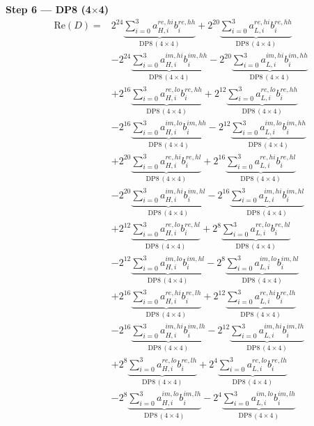 \documentclass[fleqn]{article}
\newcommand{\DPop}[3]{\mathrm{DP#1}\,(#2\!\times\!#3)}
\begin{document}
\textbf{Step 6 --- DP8 (4$\times$4)}
\begin{align*}
\mathrm{Re}(D) = {}
  & 2^{24}\underbrace{\sum_{i=0}^{3} a_{H,i}^{re,hi} b_i^{re,hh}}_{\DPop{8}{4}{4}} + 2^{20}\underbrace{\sum_{i=0}^{3} a_{L,i}^{re,hi} b_i^{re,hh}}_{\DPop{8}{4}{4}} \\[0.4em]
  & - 2^{24}\underbrace{\sum_{i=0}^{3} a_{H,i}^{im,hi} b_i^{im,hh}}_{\DPop{8}{4}{4}} - 2^{20}\underbrace{\sum_{i=0}^{3} a_{L,i}^{im,hi} b_i^{im,hh}}_{\DPop{8}{4}{4}} \\[0.4em]
  & + 2^{16}\underbrace{\sum_{i=0}^{3} a_{H,i}^{re,lo} b_i^{re,hh}}_{\DPop{8}{4}{4}} + 2^{12}\underbrace{\sum_{i=0}^{3} a_{L,i}^{re,lo} b_i^{re,hh}}_{\DPop{8}{4}{4}} \\[0.4em]
  & - 2^{16}\underbrace{\sum_{i=0}^{3} a_{H,i}^{im,lo} b_i^{im,hh}}_{\DPop{8}{4}{4}} - 2^{12}\underbrace{\sum_{i=0}^{3} a_{L,i}^{im,lo} b_i^{im,hh}}_{\DPop{8}{4}{4}} \\[0.4em]
  & + 2^{20}\underbrace{\sum_{i=0}^{3} a_{H,i}^{re,hi} b_i^{re,hl}}_{\DPop{8}{4}{4}} + 2^{16}\underbrace{\sum_{i=0}^{3} a_{L,i}^{re,hi} b_i^{re,hl}}_{\DPop{8}{4}{4}} \\[0.4em]
  & - 2^{20}\underbrace{\sum_{i=0}^{3} a_{H,i}^{im,hi} b_i^{im,hl}}_{\DPop{8}{4}{4}} - 2^{16}\underbrace{\sum_{i=0}^{3} a_{L,i}^{im,hi} b_i^{im,hl}}_{\DPop{8}{4}{4}} \\[0.4em]
  & + 2^{12}\underbrace{\sum_{i=0}^{3} a_{H,i}^{re,lo} b_i^{re,hl}}_{\DPop{8}{4}{4}} + 2^{8}\underbrace{\sum_{i=0}^{3} a_{L,i}^{re,lo} b_i^{re,hl}}_{\DPop{8}{4}{4}} \\[0.4em]
  & - 2^{12}\underbrace{\sum_{i=0}^{3} a_{H,i}^{im,lo} b_i^{im,hl}}_{\DPop{8}{4}{4}} - 2^{8}\underbrace{\sum_{i=0}^{3} a_{L,i}^{im,lo} b_i^{im,hl}}_{\DPop{8}{4}{4}} \\[0.4em]
  & + 2^{16}\underbrace{\sum_{i=0}^{3} a_{H,i}^{re,hi} b_i^{re,lh}}_{\DPop{8}{4}{4}} + 2^{12}\underbrace{\sum_{i=0}^{3} a_{L,i}^{re,hi} b_i^{re,lh}}_{\DPop{8}{4}{4}} \\[0.4em]
  & - 2^{16}\underbrace{\sum_{i=0}^{3} a_{H,i}^{im,hi} b_i^{im,lh}}_{\DPop{8}{4}{4}} - 2^{12}\underbrace{\sum_{i=0}^{3} a_{L,i}^{im,hi} b_i^{im,lh}}_{\DPop{8}{4}{4}} \\[0.4em]
  & + 2^{8}\underbrace{\sum_{i=0}^{3} a_{H,i}^{re,lo} b_i^{re,lh}}_{\DPop{8}{4}{4}} + 2^{4}\underbrace{\sum_{i=0}^{3} a_{L,i}^{re,lo} b_i^{re,lh}}_{\DPop{8}{4}{4}} \\[0.4em]
  & - 2^{8}\underbrace{\sum_{i=0}^{3} a_{H,i}^{im,lo} b_i^{im,lh}}_{\DPop{8}{4}{4}} - 2^{4}\underbrace{\sum_{i=0}^{3} a_{L,i}^{im,lo} b_i^{im,lh}}_{\DPop{8}{4}{4}} \\[0.4em]

\end{align*}
\end{document}
